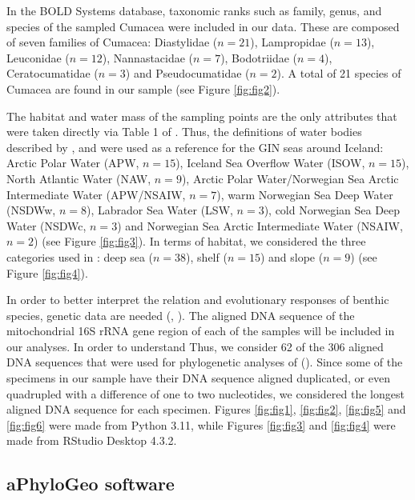 In the BOLD Systems database, taxonomic ranks such as family, genus, and species of the sampled Cumacea were included in our data. These are composed of seven families of Cumacea: Diastylidae (\( n=21 \)), Lampropidae (\( n=13 \)), Leuconidae (\( n=12 \)), Nannastacidae (\( n=7 \)), Bodotriidae (\( n=4 \)), Ceratocumatidae (\( n=3 \)) and Pseudocumatidae (\( n=2 \)). A total of 21 species of Cumacea are found in our sample (see Figure \ref{fig:fig2}).

The habitat and water mass of the sampling points are the only attributes that were taken directly via Table 1 of \cite{uhlir_adding_2021}. Thus, the definitions of water bodies described by \cite{hansen_north_2000},\cite{brix2010distribution} and \cite{ostmann_marine_2014} were used as a reference for the GIN seas around Iceland: Arctic Polar Water (APW, \( n=15 \)), Iceland Sea Overflow Water (ISOW, \( n=15 \)), North Atlantic Water (NAW, \( n=9 \)), Arctic Polar Water/Norwegian Sea Arctic Intermediate Water (APW/NSAIW, \( n=7 \)), warm Norwegian Sea Deep Water (NSDWw, \( n=8 \)), Labrador Sea Water (LSW, \( n=3 \)), cold Norwegian Sea Deep Water (NSDWc, \( n=3 \)) and Norwegian Sea Arctic Intermediate Water (NSAIW, \( n=2 \)) (see Figure \ref{fig:fig3}). In terms of habitat, we considered the three categories used in \cite{uhlir_adding_2021}: deep sea (\( n=38 \)), shelf (\( n=15 \)) and slope (\( n=9 \)) (see Figure \ref{fig:fig4}).

In order to better interpret the relation and evolutionary responses of benthic species, genetic data are needed (\cite{wilson_speciation_1987}, \cite{uhlir_adding_2021}). The aligned DNA sequence of the mitochondrial 16S rRNA gene region of each of the samples will be included in our analyses. In order to understand  Thus, we consider 62 of the 306 aligned DNA sequences that were used for phylogenetic analyses of (\cite{uhlir_adding_2021}). Since some of the specimens in our sample have their DNA sequence aligned duplicated, or even quadrupled with a difference of one to two nucleotides, we considered the longest aligned DNA sequence for each specimen. Figures  \ref{fig:fig1},  \ref{fig:fig2}, \ref{fig:fig5} and \ref{fig:fig6} were made from Python 3.11, while Figures \ref{fig:fig3} and \ref{fig:fig4} were made from RStudio Desktop 4.3.2.

\subsection{aPhyloGeo software}

